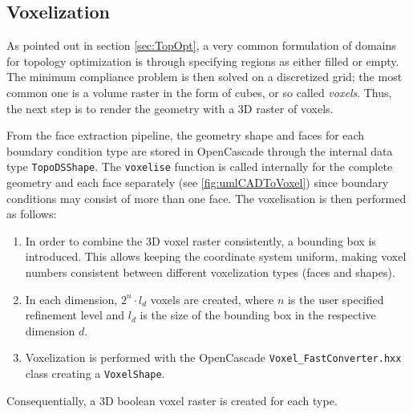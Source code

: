 \subsection{Voxelization}
\label{sec: Voxelization}

As pointed out in section \ref{sec:TopOpt}, a very common formulation of domains for topology optimization is through specifying regions as either filled or empty. The minimum compliance problem is then solved on a discretized grid; the most common one is a volume raster in the form of cubes, or so called \emph{voxels}. Thus, the next step is to render the geometry with a 3D raster of voxels.

From the face extraction pipeline, the geometry shape and faces for each boundary condition type are stored in OpenCascade through the internal data type \lstinline|TopoDSShape|. The \lstinline|voxelise| function is called internally for the complete geometry and each face separately (see \autoref{fig:umlCADToVoxel}) since boundary conditions may consist of more than one face. The voxelisation is then performed as follows: 
\begin{enumerate}
\item In order to combine the 3D voxel raster consistently, a bounding box is introduced. This allows keeping the coordinate system uniform, making voxel numbers consistent between different voxelization types (faces and shapes). 
\item In each dimension, $2^n \cdot l_d$ voxels are created, where $n$ is the user specified refinement level and $l_d$ is the size of the bounding box in the respective dimension $d$.
\item Voxelization is performed with the OpenCascade  \lstinline|Voxel_FastConverter.hxx| class creating a \lstinline|VoxelShape|.
\end{enumerate}
Consequentially, a 3D boolean voxel raster is created for each type.
\newpage